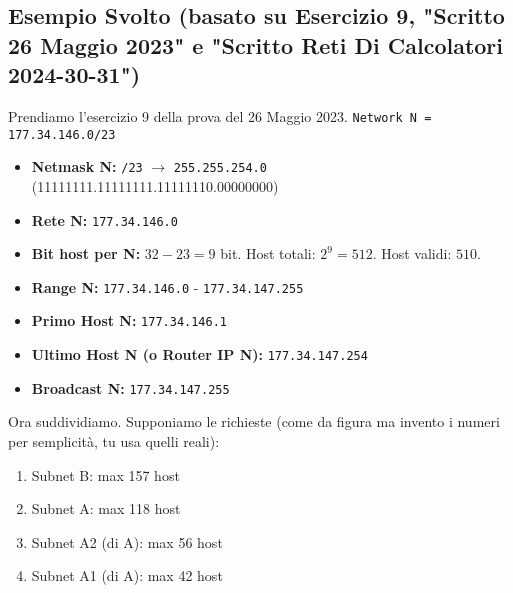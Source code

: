 \subsection{Esempio Svolto (basato su Esercizio 9, "Scritto 26 Maggio 2023" e "Scritto Reti Di Calcolatori 2024-30-31")}
Prendiamo l'esercizio 9 della prova del 26 Maggio 2023.
\texttt{Network N = 177.34.146.0/23}
\begin{itemize}
    \item \textbf{Netmask N:} \texttt{/23} $\to$ \texttt{255.255.254.0} (11111111.11111111.11111110.00000000)
    \item \textbf{Rete N:} \texttt{177.34.146.0}
    \item \textbf{Bit host per N:} $32 - 23 = 9$ bit. Host totali: $2^9 = 512$. Host validi: $510$.
    \item \textbf{Range N:} \texttt{177.34.146.0} - \texttt{177.34.147.255}
    \item \textbf{Primo Host N:} \texttt{177.34.146.1}
    \item \textbf{Ultimo Host N (o Router IP N):} \texttt{177.34.147.254}
    \item \textbf{Broadcast N:} \texttt{177.34.147.255}
\end{itemize}

Ora suddividiamo. Supponiamo le richieste (come da figura ma invento i numeri per semplicità, tu usa quelli reali):
\begin{enumerate}[label=\arabic*.]
    \item Subnet B: max 157 host
    \item Subnet A: max 118 host
    \item Subnet A2 (di A): max 56 host
    \item Subnet A1 (di A): max 42 host
\end{enumerate}


